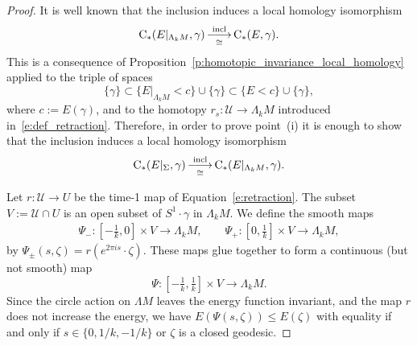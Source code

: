 \documentclass[reqno]{amsart}
\numberwithin{equation}{section}
\theoremstyle{personal}%
\theoremstyle{definition}
\newcommand{\incl}{\mathrm{incl}}
\newcommand{\Loc}{\mathrm{C}}
\DeclareRobustCommand{\llongrightarrow}{\relbar\joinrel\relbar\joinrel\rightarrow}
\DeclareMathOperator*{\ttoup}{\llongrightarrow}
\begin{document}
\begin{proof}
It is well known that the inclusion induces a local homology isomorphism
\begin{align*}
\Loc_*(E|_{\Lambda_kM},\gamma)
\ttoup_{\cong}^{\incl}
\Loc_*(E,\gamma).
\end{align*}
This is a consequence of Proposition~\ref{p:homotopic_invariance_local_homology} applied to the triple of spaces 
\[\{\gamma\}\subset \{E|_{\Lambda_kM}<c\}\cup\{\gamma\} \subset \{E<c\}\cup\{\gamma\},\]
where $c:=E(\gamma)$, and to the homotopy $r_s:\mathcal U\to\Lambda_kM$ introduced in~\eqref{e:def_retraction}. Therefore, in order to prove point~(i) it is enough to show that the inclusion induces a local homology isomorphism
\begin{align*}
\Loc_*(E|_{\Sigma},\gamma)
\ttoup_{\cong}^{\incl}
\Loc_*(E|_{\Lambda_kM},\gamma).
\end{align*}

Let $r:\mathcal U\to U$ be the time-1 map of  Equation~\eqref{e:retraction}. The subset $V:=\mathcal U\cap U$ is an open subset of $S^1\cdot\gamma$ in $\Lambda_kM$.  We define the smooth maps 
\begin{align*}
\Psi_-:[-\tfrac1k,0]\times V\to\Lambda_kM,
\qquad
\Psi_+:[0,\tfrac1k]\times V\to\Lambda_kM,
\end{align*}
by $\Psi_\pm(s,\zeta)=r(e^{2\pi i s}\cdot\zeta)$. These maps glue together to form a continuous (but not smooth) map 
\[\Psi:[-\tfrac1k,\tfrac1k]\times V\to\Lambda_kM.\]
Since the circle action on $\Lambda M$ leaves the energy function invariant, and the map $r$ does not increase the energy, we have $E(\Psi(s,\zeta))\leq E(\zeta)$ with equality if and only if $s\in\{0,1/k,-1/k\}$ or $\zeta$ is a closed geodesic.



\end{proof}
\end{document}
